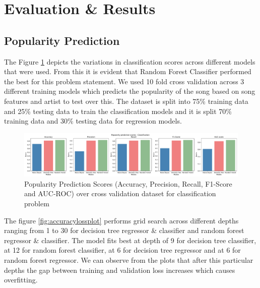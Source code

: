 \documentclass{article}
\begin{document}
\section{Evaluation \& Results}


\subsection{Popularity Prediction}


The Figure \ref{fig:ScoresBarPlotPopularityPredict} depicts the variations in classification scores across different models that were used. From this it is evident that Random Forest Classifier performed the best for this problem statement. We used 10 fold cross validation across 3 different training models which predicts the popularity of the song based on song features and artist to test over this. The dataset is split into 75\% training data and 25\% testing data to train the classification models and it is split 70\% training data and 30\% testing data for regression models.


\begin{figure}[!ht]
    \centering
    \includegraphics[width=\linewidth]{Figures/Popularity_prediction_scores_Classification.pdf}
    \caption{Popularity Prediction Scores (Accuracy, Precision, Recall, F1-Score and AUC-ROC) over cross validation dataset for classification problem}
    \label{fig:ScoresBarPlotPopularityPredict}
\end{figure} 


The figure \ref{fig:accuracylossplot} performs grid search across different depths ranging from 1 to 30 for decision tree regressor \& classifier and random forest regressor \& classifier. The model fits best at depth of 9 for decision tree classifier, at 12 for random forest classifier, at 6 for decision tree regressor and at 6 for random forest regressor. We can observe from the plots that after this particular depths the gap between training and validation loss increases which causes overfitting. 
\end{document}
